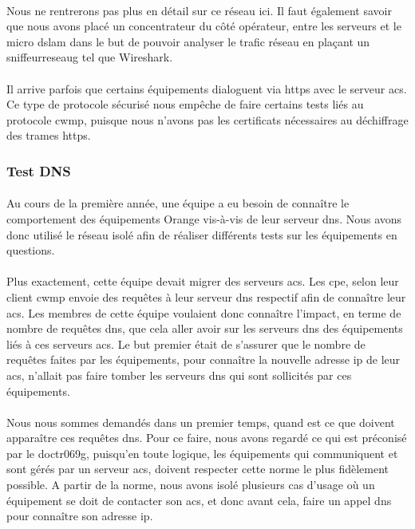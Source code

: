 \documentclass[12pt,a4paper]{report}
\begin{document}
\paragraph*{}Nous ne rentrerons pas plus en détail sur ce réseau ici. Il faut également savoir que nous avons placé un concentrateur du côté opérateur, entre les serveurs et le micro \gls{dslam} dans le but de pouvoir analyser le trafic réseau en plaçant un \gls{sniffeurreseaug} tel que Wireshark. 
\paragraph*{}Il arrive parfois que certains équipements dialoguent via \gls{https} avec le serveur \gls{acs}. Ce type de protocole sécurisé nous empêche de faire certains tests liés au protocole \gls{cwmp}, puisque nous n’avons pas les certificats nécessaires au déchiffrage des trames \gls{https}. \\
\subsubsection{Test DNS}
\paragraph*{}Au cours de la première année, une équipe a eu besoin de connaître le comportement des équipements Orange vis-à-vis de leur serveur \gls{dns}. Nous avons donc utilisé le réseau isolé afin de réaliser différents tests sur les équipements en questions.
\paragraph*{}Plus exactement, cette équipe devait migrer des serveurs \gls{acs}. Les \gls{cpe}, selon leur client \gls{cwmp} envoie des requêtes à leur serveur \gls{dns} respectif afin de connaître leur \gls{acs}. Les membres de cette équipe voulaient donc connaître l’impact, en terme de nombre de requêtes \gls{dns}, que cela aller avoir sur les serveurs \gls{dns} des équipements liés à ces serveurs \gls{acs}. Le but premier était de s’assurer que le nombre de requêtes faites par les équipements, pour connaître la nouvelle adresse \gls{ip} de leur \gls{acs}, n’allait pas faire tomber les serveurs \gls{dns} qui sont sollicités par ces équipements. 
\paragraph*{}Nous nous sommes demandés dans un premier temps, quand est ce que doivent apparaître ces requêtes \gls{dns}. Pour ce faire, nous avons regardé ce qui est préconisé par le \gls{doctr069g}, puisqu’en toute logique, les équipements qui communiquent et sont gérés par un serveur \gls{acs}, doivent respecter cette norme le plus fidèlement possible. A partir de la norme, nous avons isolé plusieurs cas d’usage où un équipement se doit de contacter son \gls{acs}, et donc avant cela, faire un appel \gls{dns} pour connaître son adresse \gls{ip}. 
\end{document}
